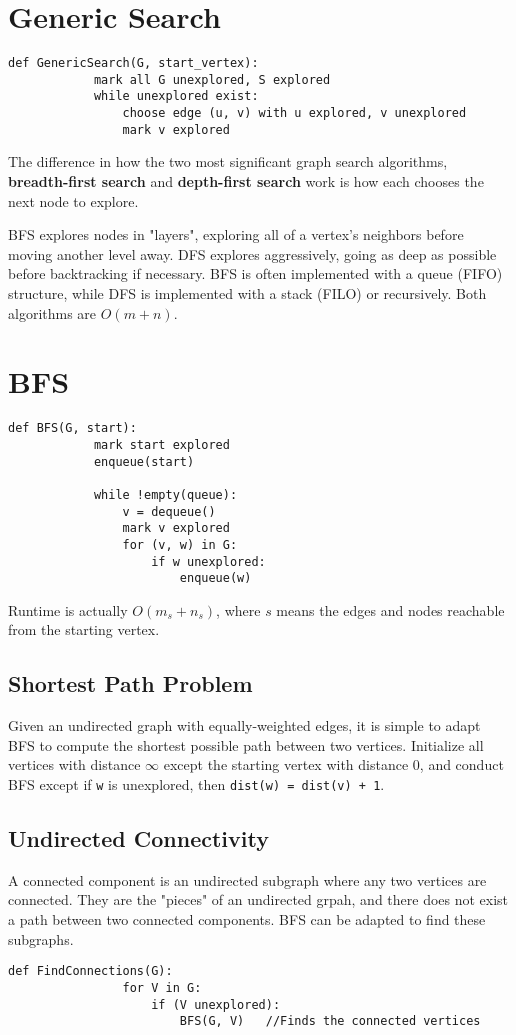 \documentclass[11pt]{article}
\begin{document}
\section{Generic Search}
	\begin{lstlisting}[autogobble=true]
		def GenericSearch(G, start_vertex):
			mark all G unexplored, S explored
			while unexplored exist:
				choose edge (u, v) with u explored, v unexplored
				mark v explored
	\end{lstlisting}
	
	The difference in how the two most significant graph search algorithms, \textbf{breadth-first search} and \textbf{depth-first search} work is how each chooses the next node to explore.
	
	BFS explores nodes in "layers", exploring all of a vertex's neighbors before moving another level away. DFS explores aggressively, going as deep as possible before backtracking if necessary. BFS is often implemented with a queue (FIFO) structure, while DFS is implemented with a stack (FILO) or recursively. Both algorithms are $O(m+n)$.
	
\section{BFS}
	\begin{lstlisting}[autogobble=true]
		def BFS(G, start):
			mark start explored
			enqueue(start)
			
			while !empty(queue):
				v = dequeue()
				mark v explored
				for (v, w) in G:
					if w unexplored:
						enqueue(w)
	\end{lstlisting}
	
	Runtime is actually $O(m_s + n_s)$, where $s$ means the edges and nodes reachable from the starting vertex.
	
	\subsection{Shortest Path Problem}
		Given an undirected graph with equally-weighted edges, it is simple to adapt BFS to compute the shortest possible path between two vertices. Initialize all vertices with distance $\infty$ except the starting vertex with distance 0, and conduct BFS except if \verb|w| is unexplored, then \verb|dist(w) = dist(v) + 1|.
		
	\subsection{Undirected Connectivity}
		A connected component is an undirected subgraph where any two vertices are connected. They are the "pieces" of an undirected grpah, and there does not exist a path between two connected components. BFS can be adapted to find these subgraphs.
		\begin{lstlisting}[autogobble=true]
			def FindConnections(G):
				for V in G:
					if (V unexplored):
						BFS(G, V)	//Finds the connected vertices
		\end{lstlisting}
		
\end{document}
